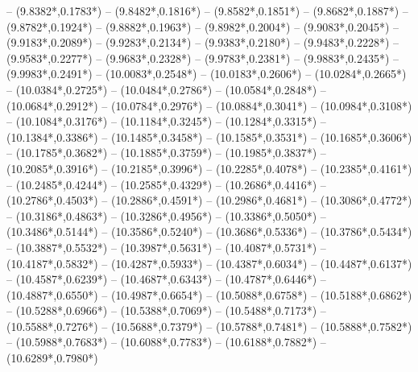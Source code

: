 {	-- ({9.8382*\dx},{0.1783*\dy})
	-- ({9.8482*\dx},{0.1816*\dy})
	-- ({9.8582*\dx},{0.1851*\dy})
	-- ({9.8682*\dx},{0.1887*\dy})
	-- ({9.8782*\dx},{0.1924*\dy})
	-- ({9.8882*\dx},{0.1963*\dy})
	-- ({9.8982*\dx},{0.2004*\dy})
	-- ({9.9083*\dx},{0.2045*\dy})
	-- ({9.9183*\dx},{0.2089*\dy})
	-- ({9.9283*\dx},{0.2134*\dy})
	-- ({9.9383*\dx},{0.2180*\dy})
	-- ({9.9483*\dx},{0.2228*\dy})
	-- ({9.9583*\dx},{0.2277*\dy})
	-- ({9.9683*\dx},{0.2328*\dy})
	-- ({9.9783*\dx},{0.2381*\dy})
	-- ({9.9883*\dx},{0.2435*\dy})
	-- ({9.9983*\dx},{0.2491*\dy})
	-- ({10.0083*\dx},{0.2548*\dy})
	-- ({10.0183*\dx},{0.2606*\dy})
	-- ({10.0284*\dx},{0.2665*\dy})
	-- ({10.0384*\dx},{0.2725*\dy})
	-- ({10.0484*\dx},{0.2786*\dy})
	-- ({10.0584*\dx},{0.2848*\dy})
	-- ({10.0684*\dx},{0.2912*\dy})
	-- ({10.0784*\dx},{0.2976*\dy})
	-- ({10.0884*\dx},{0.3041*\dy})
	-- ({10.0984*\dx},{0.3108*\dy})
	-- ({10.1084*\dx},{0.3176*\dy})
	-- ({10.1184*\dx},{0.3245*\dy})
	-- ({10.1284*\dx},{0.3315*\dy})
	-- ({10.1384*\dx},{0.3386*\dy})
	-- ({10.1485*\dx},{0.3458*\dy})
	-- ({10.1585*\dx},{0.3531*\dy})
	-- ({10.1685*\dx},{0.3606*\dy})
	-- ({10.1785*\dx},{0.3682*\dy})
	-- ({10.1885*\dx},{0.3759*\dy})
	-- ({10.1985*\dx},{0.3837*\dy})
	-- ({10.2085*\dx},{0.3916*\dy})
	-- ({10.2185*\dx},{0.3996*\dy})
	-- ({10.2285*\dx},{0.4078*\dy})
	-- ({10.2385*\dx},{0.4161*\dy})
	-- ({10.2485*\dx},{0.4244*\dy})
	-- ({10.2585*\dx},{0.4329*\dy})
	-- ({10.2686*\dx},{0.4416*\dy})
	-- ({10.2786*\dx},{0.4503*\dy})
	-- ({10.2886*\dx},{0.4591*\dy})
	-- ({10.2986*\dx},{0.4681*\dy})
	-- ({10.3086*\dx},{0.4772*\dy})
	-- ({10.3186*\dx},{0.4863*\dy})
	-- ({10.3286*\dx},{0.4956*\dy})
	-- ({10.3386*\dx},{0.5050*\dy})
	-- ({10.3486*\dx},{0.5144*\dy})
	-- ({10.3586*\dx},{0.5240*\dy})
	-- ({10.3686*\dx},{0.5336*\dy})
	-- ({10.3786*\dx},{0.5434*\dy})
	-- ({10.3887*\dx},{0.5532*\dy})
	-- ({10.3987*\dx},{0.5631*\dy})
	-- ({10.4087*\dx},{0.5731*\dy})
	-- ({10.4187*\dx},{0.5832*\dy})
	-- ({10.4287*\dx},{0.5933*\dy})
	-- ({10.4387*\dx},{0.6034*\dy})
	-- ({10.4487*\dx},{0.6137*\dy})
	-- ({10.4587*\dx},{0.6239*\dy})
	-- ({10.4687*\dx},{0.6343*\dy})
	-- ({10.4787*\dx},{0.6446*\dy})
	-- ({10.4887*\dx},{0.6550*\dy})
	-- ({10.4987*\dx},{0.6654*\dy})
	-- ({10.5088*\dx},{0.6758*\dy})
	-- ({10.5188*\dx},{0.6862*\dy})
	-- ({10.5288*\dx},{0.6966*\dy})
	-- ({10.5388*\dx},{0.7069*\dy})
	-- ({10.5488*\dx},{0.7173*\dy})
	-- ({10.5588*\dx},{0.7276*\dy})
	-- ({10.5688*\dx},{0.7379*\dy})
	-- ({10.5788*\dx},{0.7481*\dy})
	-- ({10.5888*\dx},{0.7582*\dy})
	-- ({10.5988*\dx},{0.7683*\dy})
	-- ({10.6088*\dx},{0.7783*\dy})
	-- ({10.6188*\dx},{0.7882*\dy})
	-- ({10.6289*\dx},{0.7980*\dy})
}
